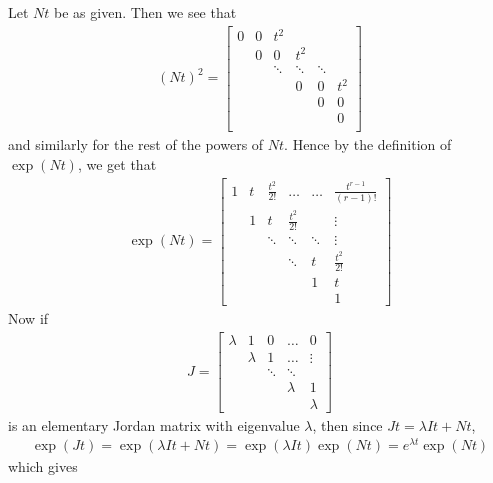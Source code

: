 \documentclass[12pt]{exam}
\theoremstyle{plain} %
\theoremstyle{definition} %
\theoremstyle{remark} %
\begin{document}
\begin{questions}
  \question
  \begin{solution}
    Let $Nt$ be as given. Then we see that
    \begin{align*}
      (Nt)^2 =
      \begin{bmatrix}
        0 & 0 & t^2 & & &\\
        & 0 & 0  & t^2 & &\\
        &  & \ddots & \ddots & \ddots & \\
        &  &   & 0 & 0  & t^2 \\
        &  &   &  & 0  & 0 \\
        & &  & &   &  0\\
      \end{bmatrix}
    \end{align*}
    and similarly for the rest of the powers of $Nt$. Hence by the
    definition of $\exp(Nt)$, we get that
    \begin{align*}
      \exp(Nt) =
      \begin{bmatrix}%
        1 & t & \frac{t^2}{2!} & \ldots & \ldots &  \frac{t^{r-1}}{(r-1)!} \\
        & 1 & t &\frac{t^2}{2!}  & & \vdots \\
        & & \ddots & \ddots & \ddots & \vdots \\
        & & & \ddots & t & \frac{t^2}{2!} \\
        & & & & 1 & t \\
        & & & & & 1
      \end{bmatrix}
    \end{align*}
    Now if
    \begin{align*} J =
      \begin{bmatrix}%
        \lambda  & 1 & 0 & \ldots & 0\\
        &  \lambda & 1 & \ldots & \vdots \\
        &  & \ddots & \ddots  & \\
        &  &  &  \lambda  & 1 \\
        &  &  &  &  \lambda
      \end{bmatrix}
    \end{align*}
    is an elementary Jordan matrix with eigenvalue $\lambda$, then
    since $Jt = \lambda I t + Nt$,
    \begin{align*}
      \exp(Jt) = \exp(\lambda It + Nt) = \exp(\lambda I t)\exp(Nt) =
      e^{\lambda t}\exp(Nt)
    \end{align*}
    which gives
    \begin{align}

\end{align}
\end{solution}
\end{questions}
\end{document}
